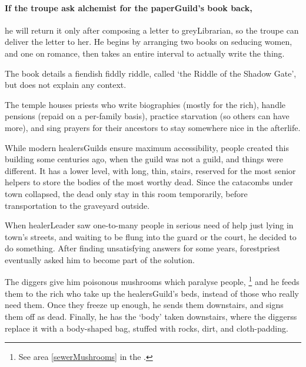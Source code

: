 \begin{multicols}{2}
\paragraph{If the troupe ask \gls{alchemist} for the \gls{paperGuild}'s book back,}
he will return it only after composing a letter to \gls{greyLibrarian}, so the troupe can deliver the letter to her.
He begins by arranging two books on seducing women, and one on romance, then takes an entire \gls{interval} to actually write the thing. 

The book details a fiendish fiddly riddle, called `the Riddle of the Shadow Gate', but does not explain any context.


\hardestRiddleEver



The temple houses priests who write biographies (mostly for the rich), handle pensions (repaid on a per-family basis), practice starvation (so others can have more), and sing prayers for their ancestors to stay somewhere nice in the afterlife.

While modern \glspl{healersGuild} ensure maximum accessibility, people created this building some centuries ago, when the guild was not a guild, and things were different.
It has a lower level, with long, thin, stairs, reserved for the most senior \glspl{helper} to store the bodies of the most worthy dead.
Since the catacombs under \gls{town} collapsed, the dead only stay in this room temporarily, before transportation to the graveyard outside.

\begin{exampletext}
  When \gls{healerLeader} saw one-to-many people in serious need of help just lying in \gls{town}'s streets, and waiting to be flung into the \gls{guard} or the \gls{court}, he decided to do something.
  After finding unsatisfying answers for some years, \gls{forestpriest} eventually asked him to become part of the solution.

  The \gls{diggers} give him poisonous mushrooms which paralyse people,
  \footnote{See area \vref{sewerMushrooms} in the .}
  and he feeds them to the rich who take up the \gls{healersGuild}'s beds, instead of those who really need them.
  Once they freeze up enough, he sends them downstairs, and signs them off as dead.
  Finally, he has the `body' taken downstairs, where the \glspl{diggers} replace it with a body-shaped bag, stuffed with rocks, dirt, and cloth-padding.
\end{exampletext}


\end{multicols}
